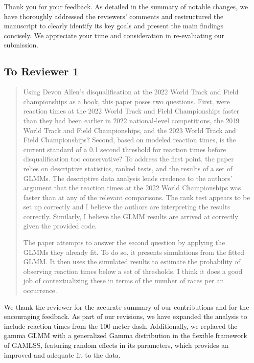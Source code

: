 \documentclass[12pt]{article}
\newenvironment{comment}%
{\begin{quotation}\noindent\small\it\color{darkblue}\ignorespaces%
}{\end{quotation}}
\begin{document}
Thank you for your feedback. As detailed in the summary of notable changes, 
we have thoroughly addressed the reviewers' comments and restructured the 
manuscript to clearly identify its key goals and present the main findings 
concisely. We appreciate your time and consideration in re-evaluating our 
submission.

\subsection*{To Reviewer 1}

\begin{comment}
Using Devon Allen's disqualification at the 2022 World Track and Field
championships as a hook, this paper poses two questions. First, were reaction
times at the 2022 World Track and Field Championships faster than they had been
earlier in 2022 national-level competitions, the 2019 World Track and Field
Championships, and the 2023 World Track and Field Championships? Second, based
on modeled reaction times, is the current standard of a 0.1 second threshold
for reaction times before disqualification too conservative? To
address the first point, the paper relies on descriptive statistics, ranked
tests, and the results of a set of GLMMs. The descriptive data analysis lends
credence to the authors' argument that the reaction times at the 2022 World
Championships was faster than at any of the relevant comparisons. The rank test
appears to be set up correctly and I believe the authors are interpreting the
results correctly. Similarly, I believe the GLMM results are arrived at
correctly given the provided code.

The paper attempts to answer the second question by applying the GLMMs they
already fit. To do so, it presents simulations from the fitted GLMM. It then
uses the simulated results to estimate the probability of observing reaction
times below a set of thresholds. I think it does a good job of contextualizing
these in terms of the number of races per an occurrence.
\end{comment}

We thank the reviewer for the accurate summary of our contributions
and for the encouraging feedback. As part of our revisions, we have
expanded the analysis to include reaction times from the 100-meter
dash. Additionally, we replaced the gamma GLMM with a generalized
Gamma distribution in the flexible framework of GAMLSS,  featuring
random effects in its parameters, which provides an improved and
adequate fit to the data.
\end{document}
